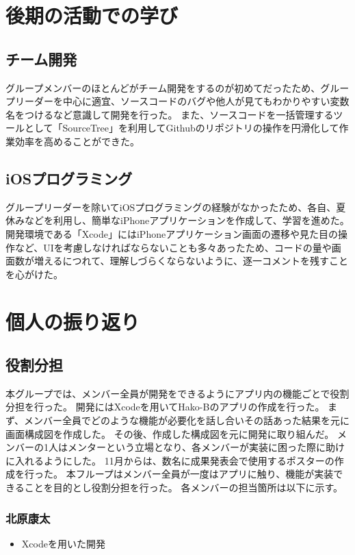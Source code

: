 \documentclass[openany,11pt,papersize]{jsbook}
\begin{document}

\section{後期の活動での学び}
\subsection{チーム開発}
グループメンバーのほとんどがチーム開発をするのが初めてだったため、グループリーダーを中心に適宜、ソースコードのバグや他人が見てもわかりやすい変数名をつけるなど意識して開発を行った。
また、ソースコードを一括管理するツールとして「SourceTree」を利用してGithubのリポジトリの操作を円滑化して作業効率を高めることができた。


\subsection{iOSプログラミング}
グループリーダーを除いてiOSプログラミングの経験がなかったため、各自、夏休みなどを利用し、簡単なiPhoneアプリケーションを作成して、学習を進めた。
開発環境である「Xcode」にはiPhoneアプリケーション画面の遷移や見た目の操作など、UIを考慮しなければならないことも多々あったため、コードの量や画面数が増えるにつれて、理解しづらくならないように、逐一コメントを残すことを心がけた。


\section{個人の振り返り}
\subsection{役割分担}
本グループでは、メンバー全員が開発をできるようにアプリ内の機能ごとで役割分担を行った。
開発にはXcodeを用いてHako-Bのアプリの作成を行った。
まず、メンバー全員でどのような機能が必要化を話し合いその話あった結果を元に画面構成図を作成した。
その後、作成した構成図を元に開発に取り組んだ。
メンバーの1人はメンターという立場となり、各メンバーが実装に困った際に助けに入れるようにした。
11月からは、数名に成果発表会で使用するポスターの作成を行った。
本フループはメンバー全員が一度はアプリに触り、機能が実装できることを目的とし役割分担を行った。
各メンバーの担当箇所は以下に示す。

\subsubsection{北原康太}
\begin{itemize}
	\item Xcodeを用いた開発
\end{itemize}
\end{document}
